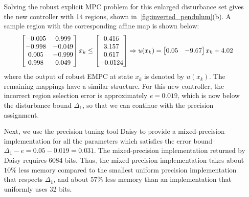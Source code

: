 %
Solving the robust explicit MPC problem for this enlarged disturbance set gives the new controller
with 14 regions, shown in~\autoref{fig:inverted_pendulum}(b).
A sample region with the corresponding affine map is shown below:
\begin{equation*}
\resizebox{.9\hsize}{!}{$
\begin{bmatrix}
-0.005  &0.999\\
-0.998  &-0.049\\
0.005  &-0.999\\
0.998   &0.049
\end{bmatrix}x_k\leq 
\begin{bmatrix}
0.416\\
3.157\\
0.617\\
-0.0124
\end{bmatrix}
\Rightarrow
u(x_k)=\begin{bmatrix}
0.05&-9.67
\end{bmatrix}x_k+4.02$}
\end{equation*}
where the output of robust EMPC at state $x_k$ is denoted by $u(x_k)$. 
The remaining mappings have a similar structure.
For this new controller, the incorrect region selection error is 
approximately $e = 0.019$, which is now below the disturbance bound $\Delta_1$,
so that we can continue with the precision assignment.


Next, we use the precision tuning tool Daisy \cite{Daisy} to provide a mixed-precision 
implementation for all the parameters which satisfies the error bound $\Delta_1  - e = 0.05 - 0.019 = 0.031$.
The mixed-precision implementation returned by Daisy requires $6084$ bits.
Thus, the mixed-precision implementation takes about $10\%$ less memory compared 
to the smallest uniform precision implementation that respects $\Delta_1$,
and about $57\%$ less memory than an implementation that uniformly uses
32 bits.

	
	
